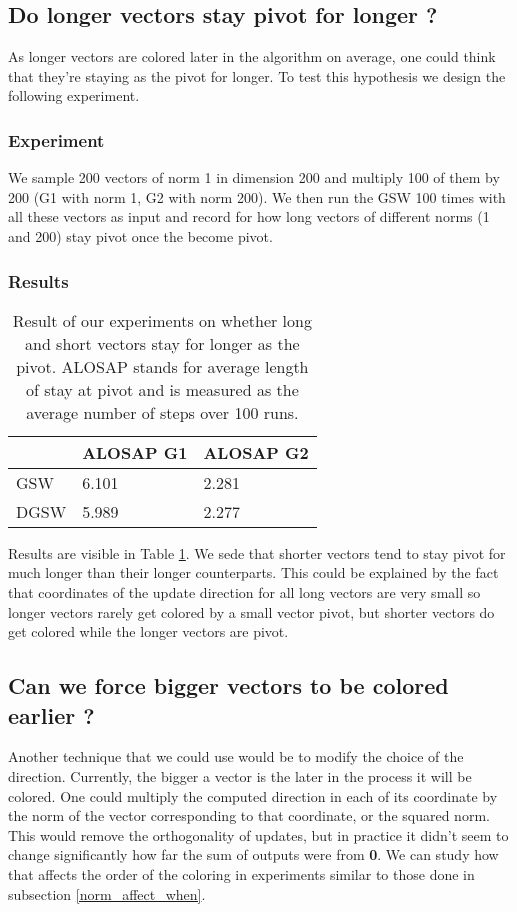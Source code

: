 \documentclass[12pt]{article}
\begin{document}
\subsection{Do longer vectors stay pivot for longer ?}\label{longer_vec_pivot_longer}
As longer vectors are colored later in the algorithm on average, one could think that they're staying as the pivot for longer. To test this hypothesis we design the following experiment.
\subsubsection{Experiment}
We sample 200 vectors of norm 1 in dimension 200 and multiply 100 of them by 200 (G1 with norm 1, G2 with norm 200). We then run the GSW 100 times with all these vectors as input and record for how long vectors of different norms (1 and 200) stay pivot once the become pivot.
\subsubsection{Results}
\begin{center}
\begin{table}[h]
\begin{tabular}{l|ll}
 &ALOSAP G1&ALOSAP G2\\
\hline
GSW&6.101&2.281\\
DGSW&5.989&2.277
\end{tabular}
\caption{Result of our experiments on whether long and short vectors stay for longer as the pivot. ALOSAP stands for average length of stay at pivot and is measured as the average number of steps over 100 runs.}
\label{pivot_longer}
\end{table}
\end{center}
Results are visible in Table \ref{pivot_longer}. We sede that shorter vectors tend to stay pivot for much longer than their longer counterparts. This could be explained by the fact that coordinates of the update direction for all long vectors are very small so longer vectors rarely get colored by a small vector pivot, but shorter vectors do get colored while the longer vectors are pivot.

\subsection{Can we force bigger vectors to be colored earlier ?}
Another technique that we could use would be to modify the choice of the direction. Currently, the bigger a vector is the later in the process it will be colored. One could multiply the computed direction in each of its coordinate by the norm of the vector corresponding to that coordinate, or the squared norm. %
This would remove the orthogonality of updates, but in practice it didn't seem to change significantly how far the sum of outputs were from \textbf{0}. We can study how that affects the order of the coloring in experiments similar to those done in subsection \ref{norm_affect_when}.
\end{document}
